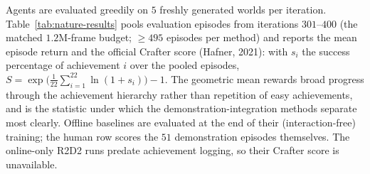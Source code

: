 Agents are evaluated greedily on $5$ freshly generated worlds per
iteration. Table~\ref{tab:nature-results} pools evaluation episodes from
iterations $301$--$400$ (the matched $1.2$M-frame budget; $\geq 495$
episodes per method) and reports the mean episode return and the official
Crafter score (Hafner, 2021): with $s_i$ the success percentage of
achievement $i$ over the pooled episodes,
$S = \exp\!\big(\tfrac{1}{22}\sum_{i=1}^{22}\ln(1+s_i)\big) - 1$. The
geometric mean rewards broad progress through the achievement hierarchy
rather than repetition of easy achievements, and is the statistic under
which the demonstration-integration methods separate most clearly. Offline
baselines are evaluated at the end of their (interaction-free) training;
the human row scores the $51$ demonstration episodes themselves. The
online-only R2D2 runs predate achievement logging, so their Crafter score
is unavailable.

\begin{table}[h]
\centering

\caption{Crafter results with the Nature CNN encoder at the matched
$1.2$M-frame budget (evaluation episodes pooled from iterations
$301$--$400$; mean $\pm$ std of per-evaluation returns). Offline baselines
use no environment interaction. Generated by
\texttt{paper\_data/architecture\_table.py}. Published reference scores at
$1$M frames: PPO $4.6\%$, Rainbow $4.3\%$, DreamerV2 ${\sim}10\%$
(Hafner, 2021).}
\label{tab:nature-results}
\end{table}
